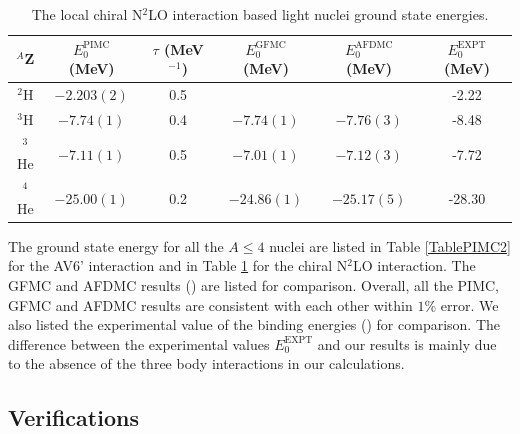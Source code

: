 \documentclass[12pt,letterpaper,UTF8]{report}
\begin{document}
\begin{table}[htbp!]
\caption[PIMC Results for the Ground State Energy of Light Nuclei Based on the Local Chiral N$^2$LO Interaction.]{The local chiral N$^2$LO interaction based light nuclei ground state energies.}
\label{TablePIMCN2LO}%
\begin{tabular*}   {1.0\textwidth}{@{\extracolsep{\fill}}cccccc}
\toprule
$^A$Z   & $E^{\text{PIMC}}_0$ (MeV) & $\tau$ (MeV$^{-1}$) & $E^{\textrm{GFMC}}_0$ (MeV) & $E^{\textrm{AFDMC}}_0$ (MeV) & $E^{\textrm{EXPT}}_0$ (MeV)   \\ \midrule
$^2$H  & $-2.203(2)$  & 0.5 & & & -2.22 \\ \midrule
$^3$H  & $-7.74(1)$  & 0.4 & $-7.74(1)$ & $-7.76(3)$ & -8.48  \\ \midrule
$^3$He  & $-7.11(1)$  & 0.5 & $-7.01(1)$ & $-7.12(3)$  & -7.72 \\ \midrule
$^4$He  & $-25.00(1)$  & 0.2 & $-24.86(1)$ & $-25.17(5)$ & -28.30 \\
\bottomrule
\end{tabular*}
\end{table}

The ground state energy for all the $A\leq 4$ nuclei are listed in Table \ref{TablePIMC2} for the AV6' interaction and in Table \ref{TablePIMCN2LO} for the chiral N$^2$LO interaction.
The GFMC and AFDMC results (\cite{Lonardoni2018PRC}) are listed for comparison.
Overall, all the PIMC, GFMC and AFDMC results are consistent with each other within $1\%$ error.
We also listed the experimental value of the binding energies (\cite{WiringaPieper02a,Lee2020FiP,wiki:NBE}) for comparison.
The difference between the experimental values $E^{\textrm{EXPT}}_0$ and our results is mainly due to the absence of the three body interactions in our calculations.








\subsection{Verifications}
\label{secVerify}
\end{document}

